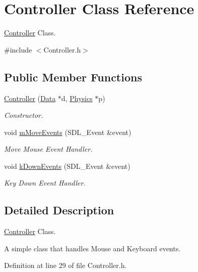 \hypertarget{classController}{\section{Controller Class Reference}
\label{classController}
}


\hyperlink{classController}{Controller} Class.  




{\ttfamily \#include $<$Controller.\-h$>$}

\subsection*{Public Member Functions}
\begin{DoxyCompactItemize}
\item 
\hyperlink{classController_a1528d018e9f08fe261455d427efd1d2f}{Controller} (\hyperlink{classData}{Data} $\ast$d, \hyperlink{classPhysics}{Physics} $\ast$p)
\begin{DoxyCompactList}\small\item\em Constructor. \end{DoxyCompactList}\item 
void \hyperlink{classController_a96c6647ef20bf9425ca1704fc5e78d2f}{m\-Move\-Events} (S\-D\-L\-\_\-\-Event \&event)
\begin{DoxyCompactList}\small\item\em Move Mouse Event Handler. \end{DoxyCompactList}\item 
void \hyperlink{classController_a6037d971c6636f752aca1cd099ba0d33}{k\-Down\-Events} (S\-D\-L\-\_\-\-Event \&event)
\begin{DoxyCompactList}\small\item\em Key Down Event Handler. \end{DoxyCompactList}\end{DoxyCompactItemize}


\subsection{Detailed Description}
\hyperlink{classController}{Controller} Class. 

A simple class that handles Mouse and Keyboard events. 

Definition at line 29 of file Controller.\-h.



